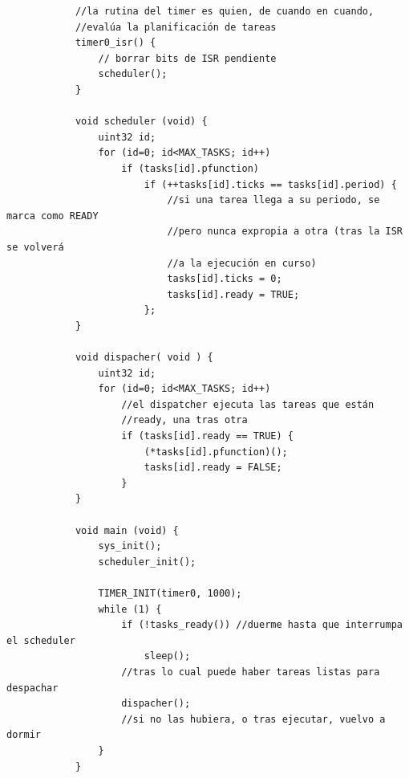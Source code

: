 \documentclass[../main.tex]{subfiles}
\begin{document}
        \begin{lstlisting}
            //la rutina del timer es quien, de cuando en cuando,
            //evalúa la planificación de tareas
            timer0_isr() {
                // borrar bits de ISR pendiente
                scheduler();
            }

            void scheduler (void) { 
                uint32 id; 
                for (id=0; id<MAX_TASKS; id++) 
                    if (tasks[id].pfunction) 
                        if (++tasks[id].ticks == tasks[id].period) { 
                            //si una tarea llega a su periodo, se marca como READY
                            //pero nunca expropia a otra (tras la ISR se volverá
                            //a la ejecución en curso)
                            tasks[id].ticks = 0;
                            tasks[id].ready = TRUE;
                        };
            }

            void dispacher( void ) { 
                uint32 id; 
                for (id=0; id<MAX_TASKS; id++) 
                    //el dispatcher ejecuta las tareas que están
                    //ready, una tras otra
                    if (tasks[id].ready == TRUE) { 
                        (*tasks[id].pfunction)(); 
                        tasks[id].ready = FALSE; 
                    } 
            }

            void main (void) { 
                sys_init(); 
                scheduler_init(); 

                TIMER_INIT(timer0, 1000); 
                while (1) { 
                    if (!tasks_ready()) //duerme hasta que interrumpa el scheduler
                        sleep();    
                    //tras lo cual puede haber tareas listas para despachar
                    dispacher(); 
                    //si no las hubiera, o tras ejecutar, vuelvo a dormir
                }
            }
        \end{lstlisting}
        
\end{document}
